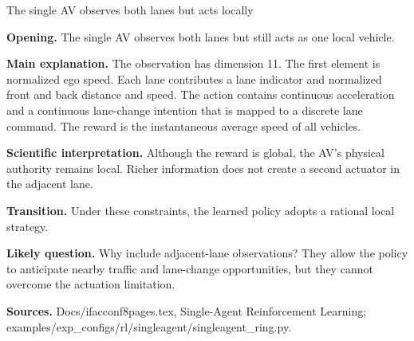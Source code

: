 \documentclass[aspectratio=169,11pt]{beamer}
\begin{document}
\begin{frame}{The single AV observes both lanes but acts locally}
{    \textbf{Opening.} The single AV observes both lanes but still acts as one local vehicle.

    \textbf{Main explanation.} The observation has dimension 11. The first element is normalized ego speed. Each lane contributes a lane indicator and normalized front and back distance and speed. The action contains continuous acceleration and a continuous lane-change intention that is mapped to a discrete lane command. The reward is the instantaneous average speed of all vehicles.

    \textbf{Scientific interpretation.} Although the reward is global, the AV's physical authority remains local. Richer information does not create a second actuator in the adjacent lane.

    \textbf{Transition.} Under these constraints, the learned policy adopts a rational local strategy.

    \textbf{Likely question.} Why include adjacent-lane observations? They allow the policy to anticipate nearby traffic and lane-change opportunities, but they cannot overcome the actuation limitation.

    \textbf{Sources.} Docs/ifacconf8pages.tex, Single-Agent Reinforcement Learning; examples/exp\_configs/rl/singleagent/singleagent\_ring.py.
  }
\end{frame}
\end{document}
